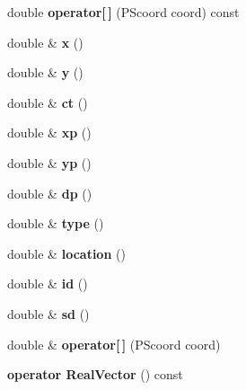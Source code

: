 \begin{DoxyCompactItemize}
double {\bfseries operator\mbox{[}$\,$\mbox{]}} (P\+Scoord coord) const
\item 
\mbox{\label{classPSvector_a3796bebfe2ff8ef2e2b1b4a37d88d27f}} 
double \& {\bfseries x} ()
\item 
\mbox{\label{classPSvector_a52338f315b75307c537fcd914b007c57}} 
double \& {\bfseries y} ()
\item 
\mbox{\label{classPSvector_afd13620c5dbc1f9c0d7188a5ae370d9f}} 
double \& {\bfseries ct} ()
\item 
\mbox{\label{classPSvector_a6168e79fc668109f9f3d6bcf66eae911}} 
double \& {\bfseries xp} ()
\item 
\mbox{\label{classPSvector_a776fef4f6aa8f619e4eda9abaa44a51c}} 
double \& {\bfseries yp} ()
\item 
\mbox{\label{classPSvector_a8d1f581cd8872a8325dd46a12e3b043d}} 
double \& {\bfseries dp} ()
\item 
\mbox{\label{classPSvector_a53aa1efa26f823754ea016e4e60d32dc}} 
double \& {\bfseries type} ()
\item 
\mbox{\label{classPSvector_adac410e12d116223e79045a0386e5fb6}} 
double \& {\bfseries location} ()
\item 
\mbox{\label{classPSvector_aa174d3501c6a13e0de5d2dcba12cada3}} 
double \& {\bfseries id} ()
\item 
\mbox{\label{classPSvector_a67f0ce982f2dea215d88c852e2915c58}} 
double \& {\bfseries sd} ()
\item 
\mbox{\label{classPSvector_a9ff2eb1777eaff719ea65ccd58f8cb59}} 
double \& {\bfseries operator\mbox{[}$\,$\mbox{]}} (P\+Scoord coord)
\item 
\mbox{\label{classPSvector_a767942ec933fccbf21ee6b5fca5f7ce2}} 
{\bfseries operator Real\+Vector} () const
\item 
\mbox{\label{classPSvector_a98cc85c692b357ab24aef22e24f97e36}} 

\end{DoxyCompactItemize}

